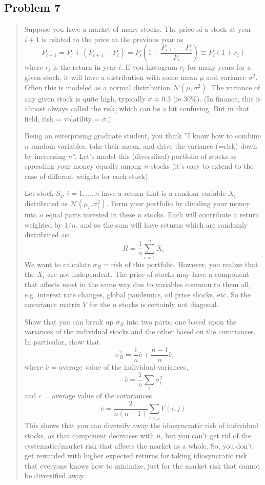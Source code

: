 \documentclass[10pt]{article}
\begin{document}
\subsection*{Problem 7}
\begin{quote}
	Suppose you have a market of many stocks. The price of a stock at year $i+1$ is related to the price at the previous year as
	$$ P_{i+1}=P_{i}+(P_{i+1}-P_{i})=P_{i}(1+\frac{P_{i+1}-P_{i}}{P_{i}})\equiv P_{i}(1+r_{i}) $$
	where $r_i$ is the return in year $i$. If you histogram $r_i$ for many years for a given stock, it will have a distribution with some mean $\mu$ and variance $\sigma^2$. Often this is modeled as a normal distribution $\mathcal{N}(\mu, \sigma^2)$. The variance of any given stock is quite high, typically $\sigma \approx 0.3$ (ie 30\%). (In finance, this is almost always called the risk, which can be a bit confusing. But in that field, risk = volatility = $\sigma$.)

	Being an enterprising graduate student, you think ''I know how to combine $n$ random variables, take their mean, and drive the variance (=risk) down by increasing $n$''. Let's model this (diversified) portfolio of stocks as spreading your money equally among $n$ stocks (it's easy to extend to the case of different weights for each stock).

	Let stock $S_i$, $i = 1, \dots, n$ have a return that is a random variable $X_i$ distributed as $\mathcal{N}(\mu_i, \sigma_i^2)$. Form your portfolio by dividing your money into $n$ equal parts invested in these $n$ stocks. Each will contribute a return weighted by $1/n$, and so the sum will have returns which are randomly distributed as:
	$$
		R = \frac{1}{n} \sum_{i=1}^{n} X_i
	$$
	We want to calculate $\sigma_R = \text{risk}$ of this portfolio. However, you realize that the $X_i$ are not independent. The price of stocks may have a component that affects most in the same way due to variables common to them all, e.g. interest rate changes, global pandemics, oil price shocks, etc. So the covariance matrix $V$ for the $n$ stocks is certainly not diagonal.

	Show that you can break up $\sigma_R$ into two parts, one based upon the variances of the individual stocks and the other based on the covariances. In particular, show that
	$$
		\sigma^2_R = \frac{1}{n} \bar{v} + \frac{n - 1}{n} \bar{c}
	$$
	where $\bar{v}$ = average value of the individual variances,
	$$
		\bar{v} = \frac{1}{n} \sum_{i} \sigma^2_i
	$$
	and $\bar{c}$ = average value of the covariances
	$$
		\bar{c} = \frac{2}{n(n - 1)} \sum_{i<j} V(i, j)
	$$
	This shows that you can diversify away the idiosyncratic risk of individual stocks, as that component decreases with $n$, but you can’t get rid of the systematic/market risk that affects the market as a whole. So, you don’t get rewarded with higher expected returns for taking idiosyncratic risk that everyone knows how to minimize, just for the market risk that cannot be diversified away.

\end{quote}
\end{document}
